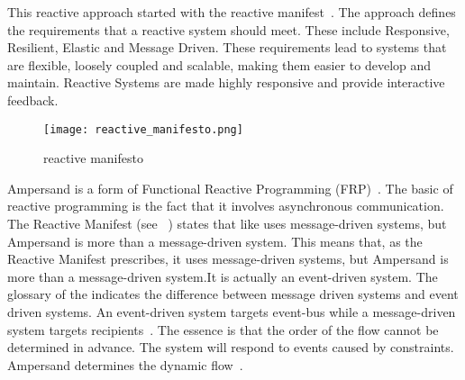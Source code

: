 This reactive approach started with the reactive manifest~.
The approach  defines the requirements that a reactive system should meet.
These include Responsive, Resilient, Elastic and Message Driven.
These requirements lead to systems that are flexible, loosely coupled and scalable, making them easier to develop and maintain.
Reactive Systems are made highly responsive and provide interactive feedback.
\begin{figure}[H] 
\texttt{[image: reactive\_manifesto.png]}
\centering
\caption{reactive manifesto}
\label{fig:reactive manifesto}
\end{figure}

Ampersand is a form of Functional Reactive Programming (FRP)~\citep{elliott_functional_1997}.
The basic of reactive programming is the fact that it involves asynchronous communication.
The Reactive Manifest (see ~) states that like uses message-driven systems, but Ampersand is more than a message-driven system.
This means that, as the Reactive Manifest prescribes, it uses message-driven systems, but Ampersand is more than a message-driven system.It is actually an event-driven system.
The glossary of the  indicates the difference between message driven systems and event driven systems.
An event-driven system targets event-bus while a message-driven system targets recipients~\citep{bainomugisha_survey_2013}.
The essence is that the order of the flow cannot be determined in advance.
The system will respond to events caused by constraints.
Ampersand determines the dynamic flow~\citep{joosten_relation_2018}.

